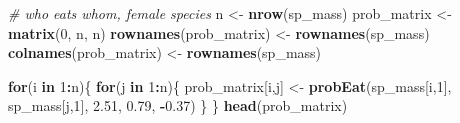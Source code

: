 \documentclass[
]{article}
\newenvironment{Shaded}{\begin{snugshade}}{\end{snugshade}}
\newcommand{\CommentTok}[1]{\textcolor[rgb]{0.56,0.35,0.01}{\textit{#1}}}
\newcommand{\ControlFlowTok}[1]{\textcolor[rgb]{0.13,0.29,0.53}{\textbf{#1}}}
\newcommand{\DecValTok}[1]{\textcolor[rgb]{0.00,0.00,0.81}{#1}}
\newcommand{\FloatTok}[1]{\textcolor[rgb]{0.00,0.00,0.81}{#1}}
\newcommand{\FunctionTok}[1]{\textcolor[rgb]{0.13,0.29,0.53}{\textbf{#1}}}
\newcommand{\NormalTok}[1]{#1}
\newcommand{\OtherTok}[1]{\textcolor[rgb]{0.56,0.35,0.01}{#1}}
\newcommand{\SpecialCharTok}[1]{\textcolor[rgb]{0.81,0.36,0.00}{\textbf{#1}}}
\begin{document}
\begin{Shaded}
\begin{Highlighting}[]
\CommentTok{\# who eats whom, female species}
\NormalTok{n }\OtherTok{\textless{}{-}} \FunctionTok{nrow}\NormalTok{(sp\_mass)}
\NormalTok{prob\_matrix }\OtherTok{\textless{}{-}} \FunctionTok{matrix}\NormalTok{(}\DecValTok{0}\NormalTok{, n, n)}
\FunctionTok{rownames}\NormalTok{(prob\_matrix) }\OtherTok{\textless{}{-}} \FunctionTok{rownames}\NormalTok{(sp\_mass)}
\FunctionTok{colnames}\NormalTok{(prob\_matrix) }\OtherTok{\textless{}{-}} \FunctionTok{rownames}\NormalTok{(sp\_mass)}

\ControlFlowTok{for}\NormalTok{(i }\ControlFlowTok{in} \DecValTok{1}\SpecialCharTok{:}\NormalTok{n)\{}
  \ControlFlowTok{for}\NormalTok{(j }\ControlFlowTok{in} \DecValTok{1}\SpecialCharTok{:}\NormalTok{n)\{}
\NormalTok{    prob\_matrix[i,j] }\OtherTok{\textless{}{-}} \FunctionTok{probEat}\NormalTok{(sp\_mass[i,}\DecValTok{1}\NormalTok{], sp\_mass[j,}\DecValTok{1}\NormalTok{], }\FloatTok{2.51}\NormalTok{, }\FloatTok{0.79}\NormalTok{, }\SpecialCharTok{{-}}\FloatTok{0.37}\NormalTok{)}
\NormalTok{  \}}
\NormalTok{\}}
\FunctionTok{head}\NormalTok{(prob\_matrix)}
\end{Highlighting}
\end{Shaded}
\end{document}
